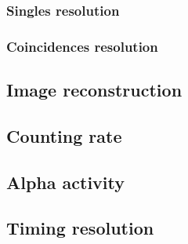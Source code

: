 \subsubsection{Singles resolution}

\subsubsection{Coincidences resolution}

\subsection{Image reconstruction}

\subsection{Counting rate}

\subsection{Alpha activity}

\subsection{Timing resolution}

